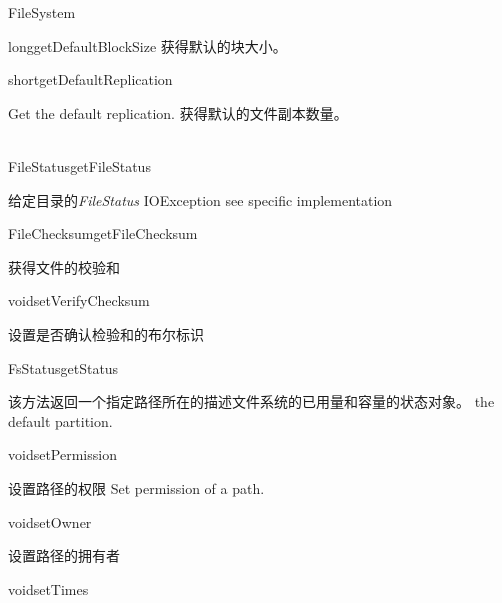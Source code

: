\begin{XeClass}{FileSystem}
\begin{XeMethod}{\XePublic}{long}{getDefaultBlockSize}
 获得默认的块大小。

    \end{XeMethod}

    \begin{XeMethod}{\XePublic}{short}{getDefaultReplication}
         
 Get the default replication.
 获得默认的文件副本数量。

    \end{XeMethod}

    \begin{XeMethod}{\XePublic \\ \XeAbstract}{FileStatus}{getFileStatus}
         
 给定目录的\emph{FileStatus}
 IOException see specific implementation

    \end{XeMethod}

    \begin{XeMethod}{\XePublic}{FileChecksum}{getFileChecksum}
         
 获得文件的校验和

    \end{XeMethod}

    \begin{XeMethod}{\XePublic}{void}{setVerifyChecksum}
         
 设置是否确认检验和的布尔标识

    \end{XeMethod}

    \begin{XeMethod}{\XePublic}{FsStatus}{getStatus}
         
 该方法返回一个指定路径所在的描述文件系统的已用量和容量的状态对象。
 the default partition.

    \end{XeMethod}

    \begin{XeMethod}{\XePublic}{void}{setPermission}
         
 设置路径的权限
 Set permission of a path.

    \end{XeMethod}

    \begin{XeMethod}{\XePublic}{void}{setOwner}
         
 设置路径的拥有者

    \end{XeMethod}

    \begin{XeMethod}{\XePublic}{void}{setTimes}
         

\end{XeMethod}
\end{XeClass}
